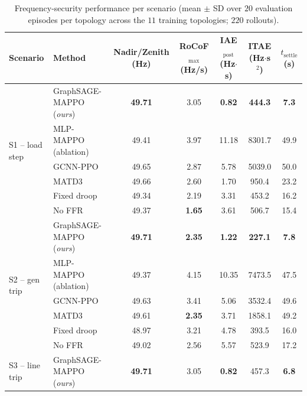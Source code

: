 \documentclass[lettersize,journal]{IEEEtran}
\begin{document}
\begin{table}[!t]
\caption{Frequency-security performance per scenario (mean $\pm$ SD over $20$ evaluation episodes per topology across the $11$ training topologies; $220$ rollouts).}
\label{tab:ffr_main}
\centering
\footnotesize
\begin{tabular}{llccccc}
\toprule
Scenario & Method & Nadir/Zenith (Hz) & RoCoF$_{\max}$ (Hz/s) &
IAE$_{\mathrm{post}}$ (Hz$\cdot$s) & ITAE (Hz$\cdot$s$^{2}$) &
$t_{\mathrm{settle}}$ (s) \\
\midrule
\multirow{6}{*}{S1 -- load step}
  & GraphSAGE-MAPPO (\emph{ours}) & \textbf{49.71} & 3.05          & \textbf{0.82}  & \textbf{444.3}  & \textbf{7.3}  \\
  & MLP-MAPPO (ablation)          & 49.41          & 3.97          & 11.18          & 8301.7          & 49.9          \\
  & GCNN-PPO                      & 49.65          & 2.87          & 5.78           & 5039.0          & 50.0          \\
  & MATD3                         & 49.66          & 2.60          & 1.70           & 950.4           & 23.2          \\
  & Fixed droop                   & 49.34          & 2.19          & 3.31           & 453.2           & 16.2          \\
  & No FFR                        & 49.37          & \textbf{1.65} & 3.61           & 506.7           & 15.4          \\
\midrule
\multirow{6}{*}{S2 -- gen trip}
  & GraphSAGE-MAPPO (\emph{ours}) & \textbf{49.71} & \textbf{2.35} & \textbf{1.22}  & \textbf{227.1}  & \textbf{7.8}  \\
  & MLP-MAPPO (ablation)          & 49.37          & 4.15          & 10.35          & 7473.5          & 47.5          \\
  & GCNN-PPO                      & 49.63          & 3.41          & 5.06           & 3532.4          & 49.6          \\
  & MATD3                         & 49.61          & \textbf{2.35} & 3.71           & 1858.1          & 49.2          \\
  & Fixed droop                   & 48.97          & 3.21          & 4.78           & 393.5           & 16.0          \\
  & No FFR                        & 49.02          & 2.56          & 5.57           & 523.9           & 17.2          \\
\midrule
\multirow{6}{*}{S3 -- line trip}
  & GraphSAGE-MAPPO (\emph{ours}) & \textbf{49.71} & 3.05          & \textbf{0.82}  & 457.3           & \textbf{6.8}  \\

\end{tabular}
\end{table}
\end{document}
